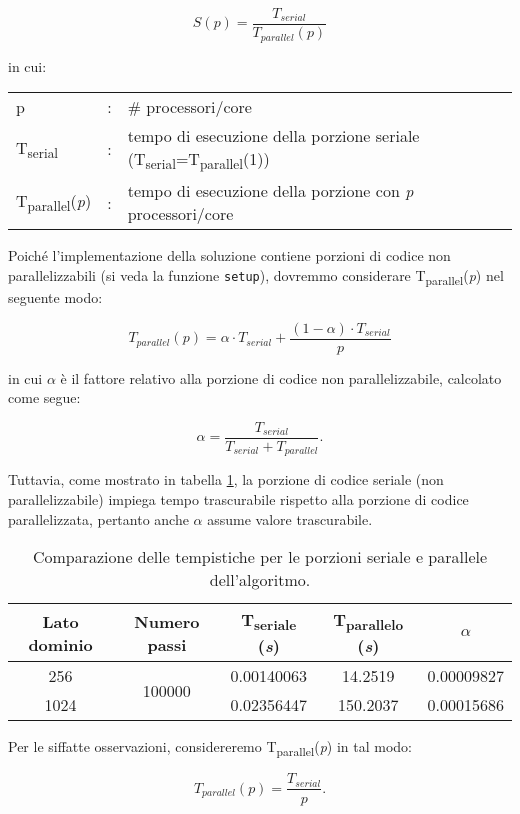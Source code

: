 \[ 
    S(p) = \frac{T_{serial}}{T_{parallel}(p)}
\]

in cui:
\begin{table}[ht]
\begin{tabular}{lll}
    p & : & \# processori/core\\
    T\textsubscript{serial}& : & tempo di esecuzione della porzione seriale
    (T\textsubscript{serial}=T\textsubscript{parallel}(1))\\
    T\textsubscript{parallel}(\textit{p}) & : & tempo di esecuzione della porzione con
    \textit{p} processori/core
\end{tabular}
\end{table}

Poiché l'implementazione della soluzione contiene porzioni di codice non
parallelizzabili (si veda la funzione \texttt{setup}), dovremmo considerare
T\textsubscript{parallel}(\textit{p}) nel seguente modo:

\[ 
T_{parallel}(p) = \alpha \cdot T_{serial} +  \frac{(1 - \alpha) \cdot
T_{serial}}{p}
\]

in cui $\alpha$ è il fattore relativo alla porzione di codice non
parallelizzabile, calcolato come segue:

\[ 
\alpha = \frac{T_{serial}}{T_{serial} + T_{parallel}}.
\]

Tuttavia, come mostrato in tabella \ref{tab:alpha}, la porzione di codice
seriale (non parallelizzabile) impiega tempo trascurabile rispetto alla porzione
di codice parallelizzata, pertanto anche $\alpha$ assume valore trascurabile.

\begin{table}[ht]
\centering
\begin{tabular}{ccccc}
\toprule
 Lato dominio & Numero passi & T\textsubscript{seriale} (\textit{s}) &
 T\textsubscript{parallelo} (\textit{s})& $\alpha$ \\
 \midrule
    256 & \multirow{2}{*}{100000} & 0.00140063 & 14.2519 & 0.00009827 \\
    1024 & & 0.02356447 & 150.2037 & 0.00015686 \\
\bottomrule
\end{tabular}
\caption{Comparazione delle tempistiche per le porzioni seriale e parallele
dell'algoritmo.\label{tab:alpha}}
\end{table}

Per le siffatte osservazioni, considereremo
T\textsubscript{parallel}(\textit{p}) in tal modo:

\[
T_{parallel}(p) = \frac{T_{serial}}{p}.
\]

